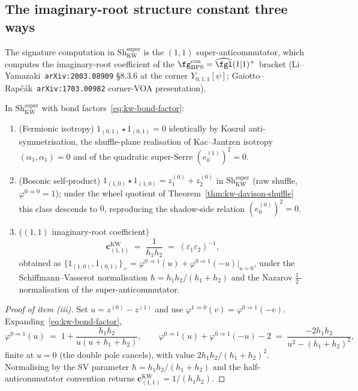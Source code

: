 \subsection{The imaginary-root structure constant three ways}
\label{subsec:shuffle-structure}

The signature computation in $\mathrm{Sh}^{\mathrm{super}}_{\mathrm{KW}}$ is the $(1,1)$ super-anticommutator, which computes the imaginary-root coefficient of the $\fg_{\mathrm{BPS}}^{\mathrm{con}} = \widehat{\fgl}(1|1)^+$ bracket (Li--Yamazaki~\texttt{arXiv:2003.08909} \S8.3.6 at the corner $Y_{0,1,1}[\psi]$; Gaiotto--Rap\v{c}\'ak~\texttt{arXiv:1703.00982} corner-VOA presentation).

\begin{proposition}
\label{prop:shuffle-low-weight}
In $\mathrm{Sh}^{\mathrm{super}}_{\mathrm{KW}}$ with bond factors~\eqref{eq:kw-bond-factor}:
\begin{enumerate}[label=\textup{(\roman*)}]
 \item \textup{(Fermionic isotropy)}
 $1_{(0,1)} \star 1_{(0,1)} = 0$ identically by Koszul anti-symmetrisation, the shuffle-plane realisation of Kac--Jantzen isotropy $(\alpha_1, \alpha_1) = 0$ and of the quadratic super-Serre $(e^{(1)}_0)^2 = 0$.
 \item \textup{(Bosonic self-product)}
 $1_{(1,0)} \star 1_{(1,0)} = z^{(0)}_1 + z^{(0)}_2$ in $\mathrm{Sh}^{\mathrm{super}}_{\mathrm{KW}}$ (raw shuffle, $\varphi^{0 \Rightarrow 0} = 1$); under the wheel quotient of Theorem~\ref{thm:kw-davison-shuffle} this class descends to $0$, reproducing the shadow-side relation $(e^{(0)}_0)^2 = 0$.
 \item \textup{($(1,1)$ imaginary-root coefficient)}
 \begin{equation}
 \label{eq:kw-c11}
 \mathbf{c}^{\mathrm{KW}}_{(1,1)}
 \;=\;
 \frac{1}{h_1 h_2}
 \;=\; (\varepsilon_1 \varepsilon_2)^{-1},
 \end{equation}
 obtained as
 $\{1_{(1,0)}, 1_{(0,1)}\}_+ = \varphi^{0 \Rightarrow 1}(u) + \varphi^{0 \Rightarrow 1}(-u) \big|_{u = 0}$, under the Schiffmann--Vasserot normalisation $\hbar = h_1 h_2 / (h_1 + h_2)$ and the Nazarov $\tfrac{1}{2}$-normalisation of the super-anticommutator.
\end{enumerate}
\end{proposition}

\begin{proof}[Proof of item \textup{(iii)}]
Set $u = z^{(0)} - z^{(1)}$ and use $\varphi^{1 \Rightarrow 0}(v) = \varphi^{0 \Rightarrow 1}(-v)$. Expanding~\eqref{eq:kw-bond-factor},
\[
 \varphi^{0 \Rightarrow 1}(u) \;=\; 1 + \frac{h_1 h_2}{u (u + h_1 + h_2)},
 \qquad
 \varphi^{0 \Rightarrow 1}(u) + \varphi^{0 \Rightarrow 1}(-u) - 2
 \;=\; \frac{-2 h_1 h_2}{u^2 - (h_1 + h_2)^2},
\]
finite at $u = 0$ (the double pole cancels), with value $2 h_1 h_2 / (h_1 + h_2)^2$. Normalising by the SV parameter $\hbar = h_1 h_2 / (h_1 + h_2)$ and the half-anticommutator convention returns $\mathbf{c}^{\mathrm{KW}}_{(1,1)} = 1/(h_1 h_2)$.
\end{proof}


